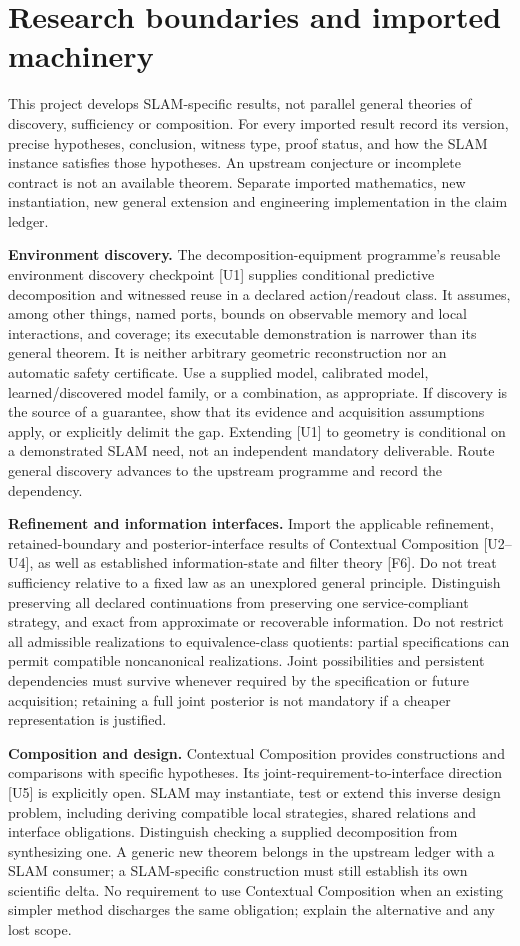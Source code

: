 \documentclass[11pt,letterpaper]{article}
\begin{document}
\section{Research boundaries and imported machinery}
This project develops SLAM-specific results, not parallel general theories of discovery, sufficiency or composition. For every imported result record its version, precise hypotheses, conclusion, witness type, proof status, and how the SLAM instance satisfies those hypotheses. An upstream conjecture or incomplete contract is not an available theorem. Separate imported mathematics, new instantiation, new general extension and engineering implementation in the claim ledger.

\textbf{Environment discovery.} The decomposition-equipment programme's reusable environment discovery checkpoint [U1] supplies conditional predictive decomposition and witnessed reuse in a declared action/readout class. It assumes, among other things, named ports, bounds on observable memory and local interactions, and coverage; its executable demonstration is narrower than its general theorem. It is neither arbitrary geometric reconstruction nor an automatic safety certificate. Use a supplied model, calibrated model, learned/discovered model family, or a combination, as appropriate. If discovery is the source of a guarantee, show that its evidence and acquisition assumptions apply, or explicitly delimit the gap. Extending [U1] to geometry is conditional on a demonstrated SLAM need, not an independent mandatory deliverable. Route general discovery advances to the upstream programme and record the dependency.

\textbf{Refinement and information interfaces.} Import the applicable refinement, retained-boundary and posterior-interface results of Contextual Composition [U2--U4], as well as established information-state and filter theory [F6]. Do not treat sufficiency relative to a fixed law as an unexplored general principle. Distinguish preserving all declared continuations from preserving one service-compliant strategy, and exact from approximate or recoverable information. Do not restrict all admissible realizations to equivalence-class quotients: partial specifications can permit compatible noncanonical realizations. Joint possibilities and persistent dependencies must survive whenever required by the specification or future acquisition; retaining a full joint posterior is not mandatory if a cheaper representation is justified.

\textbf{Composition and design.} Contextual Composition provides constructions and comparisons with specific hypotheses. Its joint-requirement-to-interface direction [U5] is explicitly open. SLAM may instantiate, test or extend this inverse design problem, including deriving compatible local strategies, shared relations and interface obligations. Distinguish checking a supplied decomposition from synthesizing one. A generic new theorem belongs in the upstream ledger with a SLAM consumer; a SLAM-specific construction must still establish its own scientific delta. No requirement to use Contextual Composition when an existing simpler method discharges the same obligation; explain the alternative and any lost scope.
\end{document}
